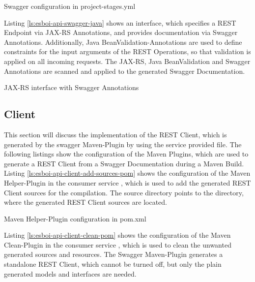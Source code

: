 \begin{listing}[h]
	\caption{Swagger configuration in project-stages.yml}
	\label{ls:esboi-api-swagger-conf}
\end{listing}

Listing \vref{ls:esboi-api-swagger-java} shows an interface, which specifies a REST Endpoint via JAX-RS Annotations, and provides documentation via Swagger Annotations. Additionally, Java BeanValidation-Annotations are used to define constraints for the input arguments of the REST Operations, so that validation is applied on all incoming requests. The JAX-RS, Java BeanValidation and Swagger Annotations are scanned and applied to the generated Swagger Documentation.
\newpage

\begin{listing}[h]
	\caption{JAX-RS interface with Swagger Annotations}
	\label{ls:esboi-api-swagger-java}
\end{listing}

\subsection{Client}
\label{sec:esbi-api-client}
This section will discuss the implementation of the REST Client, which is generated by the swagger Maven-Plugin by using the service provided  file. The following listings show the configuration of the Maven Plugins, which are used to generate a REST Client from a Swagger Documentation during a Maven Build. \\

Listing \vref{ls:esboi-api-client-add-sources-pom} shows the configuration of the Maven Helper-Plugin in the consumer service , which is used to add the generated REST Client sources for the compilation. The source directory points to the directory, where the generated REST Client sources are located.

\begin{listing}[h]
	\caption{Maven Helper-Plugin configuration in pom.xml}
	\label{ls:esboi-api-client-add-sources-pom}
\end{listing}

Listing \vref{ls:esboi-api-client-clean-pom} shows the configuration of the Maven Clean-Plugin in the consumer service , which is used to clean the unwanted generated sources and resources. The Swagger Maven-Plugin generates a standalone REST Client, which cannot be turned off, but only the plain generated models and interfaces are needed. 

